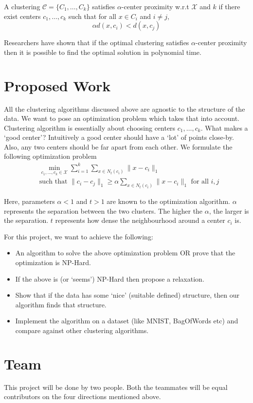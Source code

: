 \documentclass{article}
\newcommand{\mc}{\mathcal}
\begin{document}
A clustering $\mc C = \{C_1, \ldots, C_k\}$ satisfies $\alpha$-center proximity w.r.t $\mc X$ and $k$ if there exist centers $c_1, \ldots, c_k$  such that for all $x \in C_i$ and $i\neq j$, $$\alpha d(x, c_i) < d(x, c_j)$$

Researchers have shown that if the optimal clustering satisfies $\alpha$-center proximity then it is possible to find the optimal solution in polynomial time. 
\section{Proposed Work}
All the clustering algorithms discussed above are agnostic to the structure of the data. We want to pose an optimization problem which takes that into account. Clustering algorithm is essentially about choosing centers $c_1, \ldots, c_k$. What makes a `good center'? Intuitively a good center should have a `lot' of points close-by. Also, any two centers should be far apart from each other. We formulate the following optimization problem
\begin{align*}
	&\min_{c_1, \ldots, c_k \in \mc X} \sum_{i=1}^k \sum_{x \in N_t(c_i)} \|x-c_i\|_1 \\
	& \text{such that } \|c_i - c_j\|_1 \ge \alpha  \sum_{x \in N_t(c_i)} \|x-c_i\|_1 \text{ for all }i, j
\end{align*}

Here, parameters $\alpha < 1$ and $t > 1$ are known to the optimization algorithm. $\alpha$ represents the separation between the two clusters. The higher the $\alpha$, the larger is the separation. $t$ represents how dense the neighbourhood around a center $c_i$ is. 

For this project, we want to achieve the following:
\begin{itemize}
\item An algorithm to solve the above optimization problem OR prove that the optimization is NP-Hard. 
\item If the above is (or `seems') NP-Hard then propose a relaxation.
\item Show that if the data has some `nice' (suitable defined) structure, then our algorithm finds that structure.
\item Implement the algorithm on a dataset (like MNIST, BagOfWords etc) and compare against other clustering algorithms.
\end{itemize}


\section{Team}
This project will be done by two people. Both the teammates will be equal contributors on the four directions mentioned above.



\end{document}
